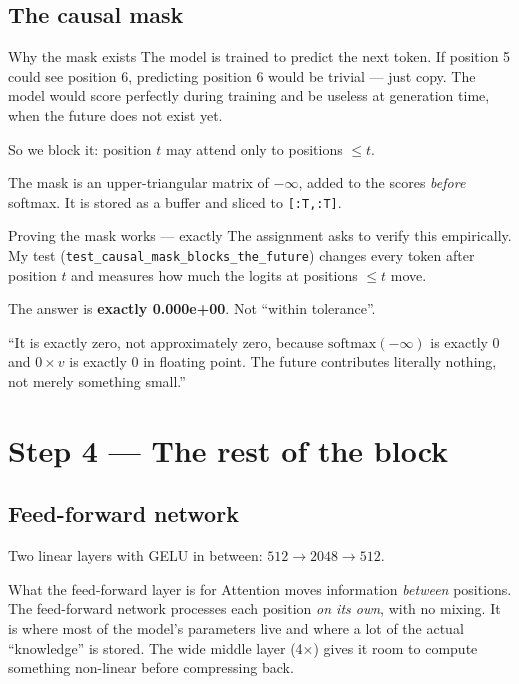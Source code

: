 \documentclass[11pt]{report}
\newcommand{\p}[1]{\texttt{#1}}
\begin{document}
\subsection{The causal mask}

\begin{concept}{Why the mask exists}
The model is trained to predict the next token. If position 5 could see position
6, predicting position 6 would be trivial --- just copy. The model would score
perfectly during training and be useless at generation time, when the future
does not exist yet.

So we block it: position $t$ may attend only to positions $\le t$.
\end{concept}

The mask is an upper-triangular matrix of $-\infty$, added to the scores
\emph{before} softmax. It is stored as a buffer and sliced to \p{[:T,:T]}.

\begin{implementation}{Proving the mask works --- exactly}
The assignment asks to verify this empirically. My test
(\p{test\_causal\_mask\_blocks\_the\_future}) changes every token after position
$t$ and measures how much the logits at positions $\le t$ move.

The answer is \textbf{exactly 0.000e+00}. Not ``within tolerance''.
\end{implementation}

\begin{saybox}
``It is exactly zero, not approximately zero, because $\mathrm{softmax}(-\infty)$
is exactly $0$ and $0 \times v$ is exactly $0$ in floating point. The future
contributes literally nothing, not merely something small.''
\end{saybox}

\section{Step 4 --- The rest of the block}

\subsection{Feed-forward network}

Two linear layers with GELU in between: $512 \rightarrow 2048 \rightarrow 512$.

\begin{concept}{What the feed-forward layer is for}
Attention moves information \emph{between} positions. The feed-forward network
processes each position \emph{on its own}, with no mixing. It is where most of
the model's parameters live and where a lot of the actual ``knowledge'' is
stored. The wide middle layer (4$\times$) gives it room to compute something
non-linear before compressing back.
\end{concept}
\end{document}
